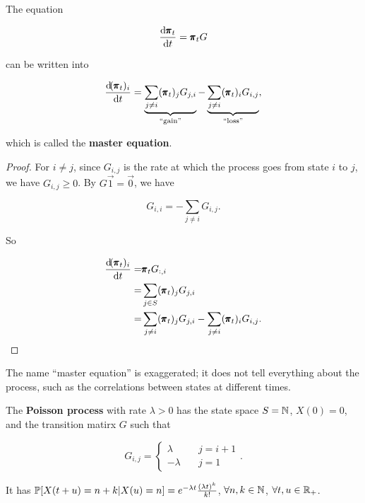 \begin{theorem}
    The equation 

    \begin{equation*}
        \frac{\dif \mbf{\pi}_t}{\dif t} = \mbf{\pi}_t G
    \end{equation*}
    
    can be written into

    \begin{equation*}
        \frac{\dif (\mbf{\pi}_t)_i}{\dif t} = \underbrace{\sum_{j \neq i} (\mbf{\pi}_t)_j G_{j, i}}_{\text{``gain''}}  - \underbrace{\sum_{j \neq i} (\mbf{\pi}_t)_i G_{i, j}}_{\text{``loss''}},
    \end{equation*}

    which is called the \textbf{master equation}.

    \begin{proof}
        For $i \neq j$, since $G_{i,j}$ is the rate at which the process goes from state $i$ to $j$, we have $G_{i,j} \ge 0$. By $G \vec{1} = \vec{0}$, we have 
    
        \begin{equation*}
            G_{i, i} = - \sum_{j \neq i} G_{i, j}.
        \end{equation*}
    
        So 
    
        \begin{align*}
            \frac{\dif (\mbf{\pi}_t)_i}{\dif t} = & \mbf{\pi}_t G_{:, i} \\ 
            = & \sum_{j \in S} (\mbf{\pi}_t)_j G_{j, i} \\ 
            = & \sum_{j \neq i} (\mbf{\pi}_t)_j G_{j, i} - \sum_{j \neq i} (\mbf{\pi}_t)_i G_{i, j}.
        \end{align*}
    \end{proof}
\end{theorem}

\begin{remark}
    The name ``master equation'' is exaggerated; it does not tell everything about the process, such as the correlations between states at different times.
\end{remark}

\begin{example}
    The \textbf{Poisson process} with rate $\lambda > 0$ has the state space $S = \mathbb{N}$, $X(0) = 0$, and the transition matirx $G$ such that 

    \begin{equation*}
        G_{i,j} = \begin{cases}
            \lambda \quad & j = i+1 \\
            -\lambda \quad & j = 1
        \end{cases}.
    \end{equation*}

    It has $\mathbb{P}[X(t+u) = n+k | X(u) = n] = e^{-\lambda t} \frac{(\lambda t)^k}{k!}$, $\forall n, k \in \mathbb{N}$, $\forall t, u \in \mathbb{R}_+$.
\end{example}

